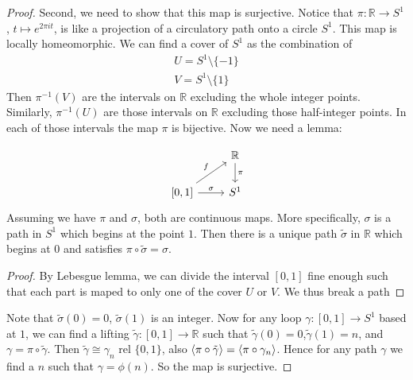 \begin{proof}
    Second, we need to show that this map is surjective. Notice that
    $\pi:\mathbb{R}\to S^1$, $t\mapsto e^{2\pi i t}$, is like a
    projection of a circulatory path onto a circle $S^1$. This map is
    locally homeomorphic. We can find a cover of $S^1$ as the
    combination of
    \begin{align*}
        U = S^1\setminus \{-1\} \\
        V = S^1\setminus \{1\}
    \end{align*}
    Then $\pi^{-1}(V)$ are the intervals on $\mathbb{R}$ excluding the
    whole integer points. Similarly, $\pi^{-1}(U)$ are those intervals
    on $\mathbb{R}$ excluding those half-integer points. In each of those
    intervals the map $\pi$ is bijective.
    Now we need a lemma:
    \begin{lemma}
        \begin{equation}
            \begin{tikzcd}[]
                \, & \mathbb{R}\ar[d,"\pi"] \\
                {[0,1]}\ar[r,"\sigma"]\ar[ru,"f"] & S^1
            \end{tikzcd}
        \end{equation}
        Assuming we have $\pi$ and $\sigma$, both are continuous maps.
        More specifically, $\sigma$ is a path in $S^1$ which begins at the
        point $1$. Then there is a unique path $\tilde\sigma$ in
        $\mathbb{R}$ which begins at $0$ and satisfies $\pi\circ
        \tilde\sigma = \sigma$.
    \end{lemma}
    \begin{proof}
        By Lebesgue lemma, we can divide the interval $[0,1]$ fine enough
        such that each part  is maped to only one of the cover $U$ or $V$.
        We thus break a path %
    \end{proof}
    Note that $\tilde\sigma(0)=0$, $\tilde\sigma(1)$ is an integer.
    Now for any loop $\gamma:[0,1]\to S^1$ based at $1$, we can find a
    lifting $\tilde\gamma:[0,1]\to \mathbb{R}$ such that
    $\tilde\gamma(0)=0$,$\tilde\gamma(1)=n$, and $\gamma = \pi\circ
    \tilde\gamma$. Then $\tilde\gamma \cong \gamma_n$ rel $\{0,1\}$,
    also $\braket{\pi\circ\tilde\gamma}=\braket{\pi\circ\gamma_n}$.
    Hence for any path $\gamma$ we find a $n$ such that
    $\gamma=\phi(n)$. So the map is surjective.


\end{proof}
